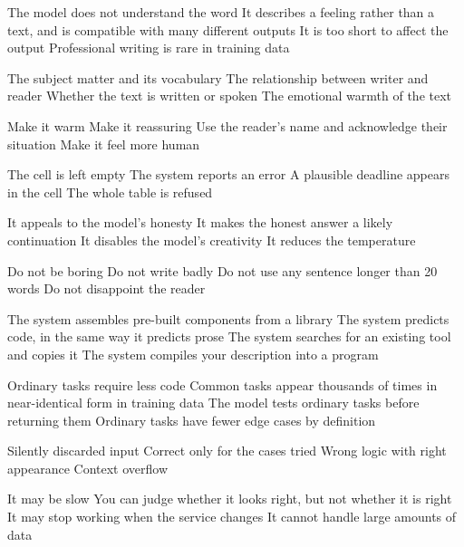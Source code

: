 \documentclass[11pt,a4paper]{article}
\begin{document}

\begin{questions}

  {The model does not understand the word}
  {It describes a feeling rather than a text, and is compatible with many different outputs}
  {It is too short to affect the output}
  {Professional writing is rare in training data}

  {The subject matter and its vocabulary}
  {The relationship between writer and reader}
  {Whether the text is written or spoken}
  {The emotional warmth of the text}

  {Make it warm}
  {Make it reassuring}
  {Use the reader's name and acknowledge their situation}
  {Make it feel more human}

  {The cell is left empty}
  {The system reports an error}
  {A plausible deadline appears in the cell}
  {The whole table is refused}

  {It appeals to the model's honesty}
  {It makes the honest answer a likely continuation}
  {It disables the model's creativity}
  {It reduces the temperature}

  {Do not be boring}
  {Do not write badly}
  {Do not use any sentence longer than 20 words}
  {Do not disappoint the reader}

  {The system assembles pre-built components from a library}
  {The system predicts code, in the same way it predicts prose}
  {The system searches for an existing tool and copies it}
  {The system compiles your description into a program}

  {Ordinary tasks require less code}
  {Common tasks appear thousands of times in near-identical form in training data}
  {The model tests ordinary tasks before returning them}
  {Ordinary tasks have fewer edge cases by definition}

  {Silently discarded input}
  {Correct only for the cases tried}
  {Wrong logic with right appearance}
  {Context overflow}

  {It may be slow}
  {You can judge whether it looks right, but not whether it is right}
  {It may stop working when the service changes}
  {It cannot handle large amounts of data}

\end{questions}
\end{document}

